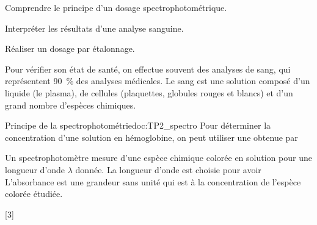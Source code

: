 \teteTermStssDosa
\vspace*{-30pt}

\begin{objectifs}
  \item Comprendre le principe d'un dosage spectrophotométrique.
  \item Interpréter les résultats d'une analyse sanguine.
  \item Réaliser un dosage par étalonnage.
\end{objectifs}

\begin{contexte}
  Pour vérifier son état de santé, on effectue souvent des analyses de sang, qui représentent \qty{90}{\percent} des analyses médicales.  
  Le sang est une solution composé d'un liquide (le plasma), de cellules (plaquettes, globules rouges et blancs) et d'un grand nombre d'espèces chimiques.
  
\end{contexte}


\begin{doc}{Principe de la spectrophotométrie}{doc:TP2_spectro}
  Pour déterminer la concentration d'une solution en hémoglobine, on peut utiliser une  obtenue par 

  Un spectrophotomètre mesure  d'une espèce chimique colorée en solution pour une longueur d'onde $\lambda$ donnée.
  La longueur d'onde est choisie pour avoir 
  L'absorbance est une grandeur sans unité qui est  à la concentration de l'espèce colorée étudiée.
\end{doc}

[3]


